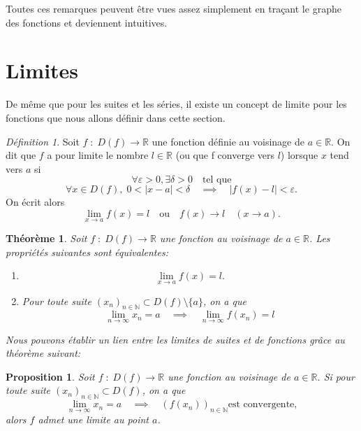 \documentclass[oneside,12pt,french,table]{book}
\theoremstyle{definition}
\theoremstyle{plain}
\newtheorem{theorem}[definition]{Théorème}
\newtheorem{proposition}[definition]{Proposition}
\theoremstyle{remark}
\newtheorem{defi}[definition]{Définition}
\newcommand{\Nn}{{\mathbb{N}}}
\newcommand{\Rr}{{\mathbb{R}}}
\begin{document}
Toutes ces remarques peuvent être vues assez simplement en traçant le graphe des fonctions et deviennent intuitives.
   \section{Limites}
   De même que pour les suites et les séries, il existe un concept de limite pour les fonctions que nous allons définir dans cette section. 

\begin{defi}
    Soit $f\; :\; D(f) \longrightarrow \Rr$ une fonction définie au voisinage de $a\in \Rr$.
    On dit que $f$ a pour limite le nombre $l\in\Rr$ (ou que f converge vers $l$) lorsque $x$ tend vers $a$ si \[
    \forall \varepsilon>0,\exists\delta>0 \quad\text{tel que}
    \]
    \[
     \forall x\in D(f), \;0<|x-a|<\delta \quad \implies \quad |f(x)-l|<\varepsilon .
    \]
    On écrit alors 
    \[
    \lim_{x\rightarrow a}f(x)=l \quad\text{ou}\quad f(x)\longrightarrow l \quad (x\rightarrow a).
    \]
\end{defi}
\begin{theorem} \label{theoreme limites finies fonctions}
    Soit $f\;:\;D(f)\longrightarrow\Rr$ une fonction au voisinage de $a\in\Rr$. 
    Les propriétés suivantes sont équivalentes:
    \begin{enumerate}
        \item \[\lim_{x\rightarrow a}f(x)=l.\]
        \item Pour toute suite $(x_n)_{n\in\Nn}\subset D(f)\setminus\{a\}$, on a que 
        \[
        \lim_{n\rightarrow \infty}x_n=a \quad \implies \quad \lim_{n\rightarrow \infty}f(x_n)=l
        \]
    \end{enumerate}
    Nous pouvons établir un lien entre les limites de suites et de fonctions grâce au théorème suivant: 
\end{theorem}
\begin{proposition}
    Soit $f\;:\;D(f)\longrightarrow\Rr$ une fonction au voisinage de $a\in\Rr$. 
    Si pour toute suite  $(x_n)_{n\in\Nn}\subset D(f)$, on a que 
    \[
    \lim_{n\rightarrow \infty}x_n=a\quad \implies \quad (f(x_n))_{n\in\Nn} \text{est convergente,}
    \]
    alors $f$ admet une limite au point $a$.
\end{proposition}
\end{document}

